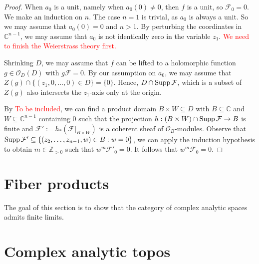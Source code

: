 \begin{proof}
    When $a_0$ is a unit, namely when $a_0(0)\neq 0$, then $f$ is a unit, so $\mathcal{F}_0=0$. We make an induction on $n$. The case $n=1$ is trivial, as $a_0$ is always a unit.
    So we may assume that $a_0(0)=0$ and $n>1$. By perturbing the coordinates in $\mathbb{C}^{n-1}$, we may assume that $a_0$ is not identically zero in the variable $z_1$. \textcolor{red}{We need to finish the Weierstrass theory first.}

    Shrinking $D$, we may assume that $f$ can be lifted to a holomorphic function $g\in \mathcal{O}_D(D)$ with $g\mathcal{F}=0$. By our assumption on $a_0$, we may assume that $Z(g)\cap \{(z_1,0,\ldots,0)\in D\}=\{0\}$. Hence, $D\cap \operatorname{Supp} \mathcal{F}$, which is a subset of $Z(g)$ also intersects the $z_1$-axis only at the origin.

    By \textcolor{red}{To be included}, we can find a product domain $B\times W\subseteq D$ with $B\subseteq \mathbb{C}$ and $W\subseteq \mathbb{C}^{n-1}$ containing $0$ such that the projection $h:(B\times W)\cap \operatorname{Supp} \mathcal{F}\rightarrow B$ is finite and $\mathcal{F}':=h_*(\mathcal{F}|_{B\times W})$ is a coherent sheaf of $\mathcal{O}_B$-modules. Observe that $\operatorname{Supp} \mathcal{F}'\subseteq \{(z_2,\ldots,z_{n-1},w)\in B:w=0\}$, we can apply the induction hypothesis to obtain $m\in \mathbb{Z}_{>0}$ such that $w^{m}\mathcal{F}'_0=0$. It follows that $w^{m}\mathcal{F}_0=0$.
\end{proof}

\section{Fiber products}

The goal of this section is to show that the category of complex analytic spaces admits finite limits.

\section{Complex analytic topos}

\printbibliography

